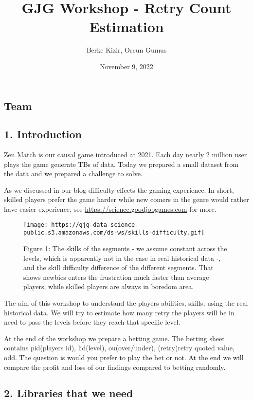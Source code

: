 \documentclass[
]{article}
\title{GJG Workshop - Retry Count Estimation}
\author{Berke Kizir, Orcun Gumus}
\date{November 9, 2022}
\begin{document}
\maketitle

\hypertarget{team}{%
\subsection{Team}\label{team}}

\hypertarget{introduction}{%
\subsection{1. Introduction}\label{introduction}}

Zen Match is our causal game introduced at 2021. Each day nearly 2
million user plays the game generate TBs of data. Today we prepared a
small dataset from the data and we prepared a challenge to solve.

As we discussed in our blog difficulty effects the gaming experience. In
short, skilled players prefer the game harder while new comers in the
genre would rather have easier experience, see
\url{https://science.goodjobgames.com} for more.

\begin{figure}
\centering
\texttt{[image: https://gjg-data-science-public.s3.amazonaws.com/ds-ws/skills-difficulty.gif]}
\caption{Figure 1: The skills of the segments - we assume constant
across the levels, which is apparently not in the case in real
historical data -, and the skill difficulty difference of the different
segments. That shows newbies enters the frustration much faster than
average players, while skilled players are always in boredom area.}
\end{figure}

The aim of this workshop to understand the players abilities, skills,
using the real historical data. We will try to estimate how many retry
the players will be in need to pass the levels before they reach that
specific level.

At the end of the workshop we prepare a betting game. The betting sheet
contains pid(players id), lid(level), ou(over/under), (retry)retry
quoted value, odd. The question is would you prefer to play the bet or
not. At the end we will compare the profit and loss of our findings
compared to betting randomly.

\hypertarget{libraries-that-we-need}{%
\subsection{2. Libraries that we need}\label{libraries-that-we-need}}
\end{document}

